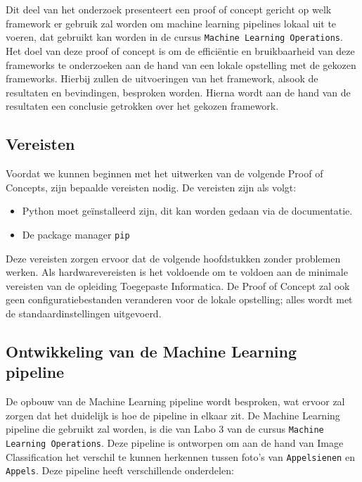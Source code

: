 \chapter{}%
\label{ch:PoC}

Dit deel van het onderzoek presenteert een proof of concept gericht op welk framework er gebruik zal worden om machine learning pipelines lokaal uit te voeren, dat gebruikt kan worden in de cursus \verb+Machine Learning Operations+.
Het doel van deze proof of concept is om de efficiëntie en bruikbaarheid van deze frameworks te onderzoeken aan de hand van een lokale opstelling met de gekozen frameworks. Hierbij zullen de uitvoeringen van het framework, alsook de resultaten en bevindingen, besproken worden.
Hierna wordt aan de hand van de resultaten een conclusie getrokken over het gekozen framework.
\section{Vereisten}


Voordat we kunnen beginnen met het uitwerken van de volgende Proof of Concepts, zijn bepaalde vereisten nodig. De vereisten zijn als volgt:
\begin{itemize}
    \item Python moet geïnstalleerd zijn, dit kan worden gedaan via de documentatie.
    \item De package manager \verb+pip+
\end{itemize}
Deze vereisten zorgen ervoor dat de volgende hoofdstukken zonder problemen werken. Als hardwarevereisten is het voldoende om te voldoen aan de minimale vereisten van de opleiding Toegepaste Informatica. De Proof of Concept zal ook geen configuratiebestanden veranderen voor de lokale opstelling; alles wordt met de standaardinstellingen uitgevoerd.
\section{Ontwikkeling van de Machine Learning pipeline}

De opbouw van de Machine Learning pipeline wordt besproken, wat ervoor zal zorgen dat het duidelijk is hoe de pipeline in elkaar zit. De Machine Learning pipeline die gebruikt zal worden, is die van Labo 3 van de cursus \verb+Machine Learning Operations+.
Deze pipeline is ontworpen om aan de hand van Image Classification het verschil te kunnen herkennen tussen foto's van \verb+Appelsienen+ en \verb+Appels+. Deze pipeline heeft verschillende onderdelen:

